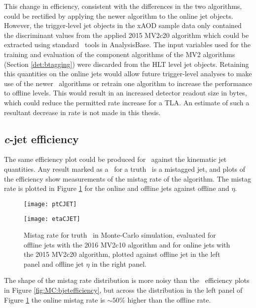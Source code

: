		This change in efficiency, consistent with the differences in the two algorithms, could be rectified by applying the newer algorithm to the online jet objects. However, the trigger-level jet objects in the xAOD sample data only contained the discriminant values from the applied 2015 MV2c20 algorithm which could be extracted using standard \btag\ tools in AnalysisBase. The input variables used for the training and evaluation of the component algorithms of the MV2 algorithms (Section \ref{det:btagging}) were discarded from the HLT level jet objects. Retaining this quantities on the online jets would allow future trigger-level analyses to make use of the newer \btag\ algorithms or retrain one algorithm to increase the performance to offline levels. This would result in an increased detector readout size in bytes, which could reduce the permitted rate increase for a TLA. An estimate of such a resultant decrease in rate is not made in this thesis.

	\subsection{\textit{c}-jet efficiency}
	The same efficiency plot could be produced for \cjets\, against the kinematic jet quantities. Any result marked as a \bjet\ for a truth \cjet\ is a mistagged jet, and plots of the efficiency show measurements of the mistag rate of the algorithm. The mistag rate is plotted in Figure \ref{fig:MC:cjetefficiency} for the online and offline jets against offline \pt and $\eta$.
		\begin{figure}[h]
			\centering
			\begin{minipage}[h]{0.48\linewidth}
				\texttt{[image: ptCJET]}

			\end{minipage}
			\quad
			\begin{minipage}[h]{0.48\linewidth}
				\texttt{[image: etaCJET]}
			\end{minipage}
			\caption{Mistag rate for truth \cjets\, in Monte-Carlo simulation, evaluated for offline jets with the 2016 MV2c10 algorithm and for online jets with the 2015 MV2c20 algorithm, plotted against offline jet \pt in the left panel and offline jet $\eta$ in the right panel.}
			\label{fig:MC:cjetefficiency}
		\end{figure}

		The shape of the mistag rate distribution is more noisy than the \bjet\ efficiency plots in Figure \ref{fig:MC:bjetefficiency}, but across the \pt distribution in the left panel of Figure \ref{fig:MC:cjetefficiency} the online mistag rate is $\sim50\%$ higher than the offline rate.

